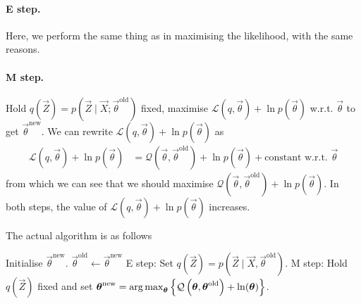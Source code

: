 \paragraph{E step.} Here, we perform the same thing as in maximising the likelihood, with the same reasons.
\paragraph{M step.} Hold $q(\vec Z) = p(\vec Z \mid \vec X; \vec \theta^{\text{old}})$ fixed, maximise $\mathcal L\left(q, \vec \theta\right) + \ln p(\vec \theta)$ w.r.t. $\vec \theta$ to get $\vec \theta^{\text{new}}$. We can rewrite $\mathcal L\left(q, \vec \theta\right) + \ln p(\vec \theta)$ as
\begin{align*}
    \mathcal L\left(q, \vec \theta\right) + \ln p(\vec \theta)  &= \mathcal Q\left(\vec \theta, \vec \theta^{\text{old}}\right) + \ln p(\vec \theta) + \text{constant w.r.t. } \vec \theta
\end{align*}
from which we can see that we should maximise $\mathcal Q\left(\vec \theta, \vec \theta^{\text{old}}\right) + \ln p(\vec \theta)$. In both steps, the value of $\mathcal L(q, \vec \theta) + \ln p(\vec \theta)$ increases.

The actual algorithm is as follows
\begin{algorithmbis}\label{alg:em-post}
    \begin{algorithmic}[1]
        \State Initialise $\vec \theta^{\text{new}}$.
        \Repeat
            \State $\vec \theta^{\text{old}} \gets \vec \theta^{\text{new}}$
            \State E step: Set $q(\vec Z) = p\left(\vec Z \mid \vec X, \vec \theta^{\text{old}}\right)$.
            \State M step: Hold $q(\vec Z)$ fixed and set $\boldsymbol{\mathbf{\theta}}^{\text{new}} = \operatorname*{arg\,max}_{\boldsymbol{\mathbf{\theta}}} \left\{\mathcal Q\left(\boldsymbol{\mathbf{\theta}}, \boldsymbol{\mathbf{\theta}}^{\text{old}}\right) + \ln(\boldsymbol{\mathbf{\theta}})\right\}$. 
    \end{algorithmic}
\end{algorithmbis}